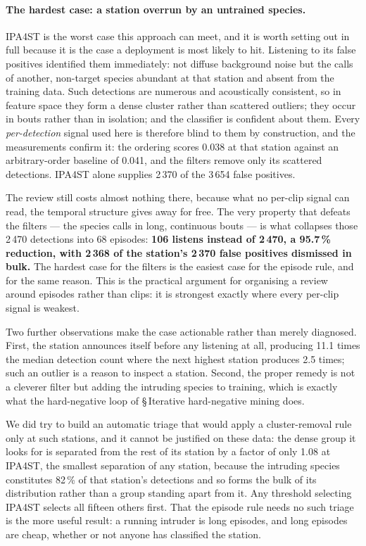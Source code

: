 \documentclass[review,3p,times]{elsarticle}
\begin{document}
\paragraph{The hardest case: a station overrun by an untrained species.}
IPA4ST is the worst case this approach can meet, and it is worth setting out in
full because it is the case a deployment is most likely to hit. Listening to its
false positives identified them immediately: not diffuse background noise but
the calls of another, non-target species abundant at that station and absent
from the training data. Such detections are numerous and acoustically
consistent, so in feature space they form a dense cluster rather than scattered
outliers; they occur in bouts rather than in isolation; and the classifier is
confident about them. Every \emph{per-detection} signal used here is therefore
blind to them by construction, and the measurements confirm it: the ordering
scores 0.038 at that station against an arbitrary-order baseline of 0.041, and
the filters remove only its scattered detections. IPA4ST alone supplies 2\,370
of the 3\,654 false positives.

The review still costs almost nothing there, because what no per-clip signal
can read, the temporal structure gives away for free. The very property that
defeats the filters --- the species calls in long, continuous bouts --- is what
collapses those 2\,470 detections into 68 episodes: \textbf{106 listens instead
of 2\,470, a 95.7\,\% reduction, with 2\,368 of the station's 2\,370 false
positives dismissed in bulk.} The hardest case for the filters is the easiest
case for the episode rule, and for the same reason. This is the practical
argument for organising a review around episodes rather than clips: it is
strongest exactly where every per-clip signal is weakest.

Two further observations make the case actionable rather than merely
diagnosed. First, the station announces itself before any listening at all,
producing 11.1 times the median detection count where the next highest station
produces 2.5 times; such an outlier is a reason to inspect a station. Second,
the proper remedy is not a cleverer filter but adding the intruding species to
training, which is exactly what the hard-negative loop of \S\,Iterative
hard-negative mining does.

We did try to build an automatic triage that would apply a cluster-removal rule
only at such stations, and it cannot be justified on these data: the dense group
it looks for is separated from the rest of its station by a factor of only 1.08
at IPA4ST, the smallest separation of any station, because the intruding
species constitutes 82\,\% of that station's detections and so forms the bulk
of its distribution rather than a group standing apart from it. Any threshold
selecting IPA4ST selects all fifteen others first. That the episode rule needs
no such triage is the more useful result: a running intruder is long episodes,
and long episodes are cheap, whether or not anyone has classified the station.
\end{document}
